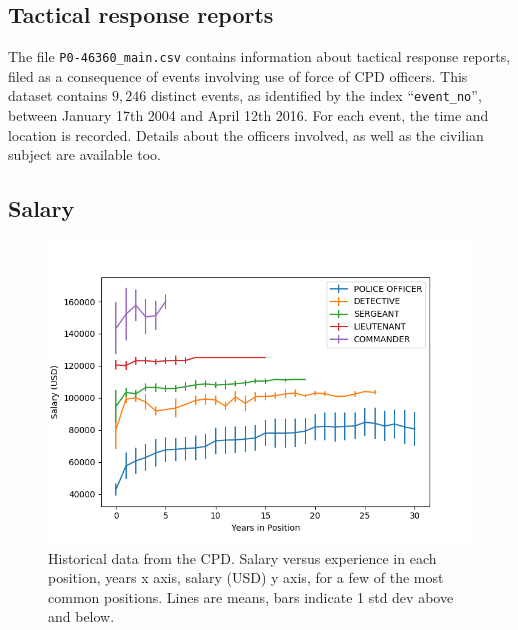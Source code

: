 \subsection{Tactical response reports}

The file \texttt{P0-46360\_main.csv} contains information about tactical response reports, filed as a consequence of  events involving use of force of CPD officers. This dataset contains $9{,}246$ distinct events, as identified by the index ``\texttt{event\_no}'', between January 17th 2004 and April 12th 2016. For each event, the time and location is recorded. Details about the officers involved, as well as the civilian subject are available too. 

\subsection{Salary}

\begin{figure}[h] 
\includegraphics[width=\textwidth]{figs/salary_experience} 
\caption{Historical data from the CPD. Salary versus experience in each
position, years x axis, salary (USD) y axis, for a few of the most common
positions. Lines are means, bars indicate 1 std dev above and below.} \label{fig:history}
\end{figure}



